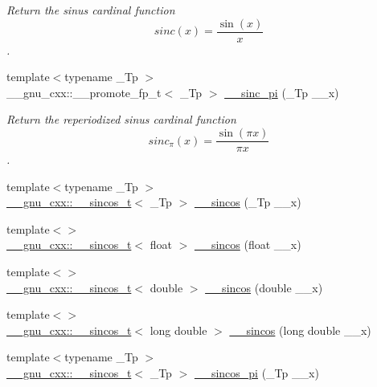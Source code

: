 \begin{DoxyCompactItemize}
\begin{DoxyCompactList}\small\item\em Return the sinus cardinal function \[ sinc(x) = \frac{\sin(x)}{x} \]. \end{DoxyCompactList}\item 
{\footnotesize template$<$typename \+\_\+\+Tp $>$ }\\\+\_\+\+\_\+gnu\+\_\+cxx\+::\+\_\+\+\_\+promote\+\_\+fp\+\_\+t$<$ \+\_\+\+Tp $>$ \hyperlink{namespacestd_1_1____detail_accfe65ec3790f60b0b429afbd4000bb1}{\+\_\+\+\_\+sinc\+\_\+pi} (\+\_\+\+Tp \+\_\+\+\_\+x)
\begin{DoxyCompactList}\small\item\em Return the reperiodized sinus cardinal function \[ sinc_\pi(x) = \frac{\sin(\pi x)}{\pi x} \]. \end{DoxyCompactList}\item 
{\footnotesize template$<$typename \+\_\+\+Tp $>$ }\\\hyperlink{struct____gnu__cxx_1_1____sincos__t}{\+\_\+\+\_\+gnu\+\_\+cxx\+::\+\_\+\+\_\+sincos\+\_\+t}$<$ \+\_\+\+Tp $>$ \hyperlink{namespacestd_1_1____detail_a59a9ff6922faa1a88da8b485ee9d37cb}{\+\_\+\+\_\+sincos} (\+\_\+\+Tp \+\_\+\+\_\+x)
\item 
{\footnotesize template$<$$>$ }\\\hyperlink{struct____gnu__cxx_1_1____sincos__t}{\+\_\+\+\_\+gnu\+\_\+cxx\+::\+\_\+\+\_\+sincos\+\_\+t}$<$ float $>$ \hyperlink{namespacestd_1_1____detail_a8cfd8b8345ebc359e31ac1631e29aeea}{\+\_\+\+\_\+sincos} (float \+\_\+\+\_\+x)
\item 
{\footnotesize template$<$$>$ }\\\hyperlink{struct____gnu__cxx_1_1____sincos__t}{\+\_\+\+\_\+gnu\+\_\+cxx\+::\+\_\+\+\_\+sincos\+\_\+t}$<$ double $>$ \hyperlink{namespacestd_1_1____detail_a76c185b3a0156ecf557afdbf552a8916}{\+\_\+\+\_\+sincos} (double \+\_\+\+\_\+x)
\item 
{\footnotesize template$<$$>$ }\\\hyperlink{struct____gnu__cxx_1_1____sincos__t}{\+\_\+\+\_\+gnu\+\_\+cxx\+::\+\_\+\+\_\+sincos\+\_\+t}$<$ long double $>$ \hyperlink{namespacestd_1_1____detail_aade98e6318f4459f37e1f79f4c871cf6}{\+\_\+\+\_\+sincos} (long double \+\_\+\+\_\+x)
\item 
{\footnotesize template$<$typename \+\_\+\+Tp $>$ }\\\hyperlink{struct____gnu__cxx_1_1____sincos__t}{\+\_\+\+\_\+gnu\+\_\+cxx\+::\+\_\+\+\_\+sincos\+\_\+t}$<$ \+\_\+\+Tp $>$ \hyperlink{namespacestd_1_1____detail_af17af8caca5ba47597cc314e93ba49cd}{\+\_\+\+\_\+sincos\+\_\+pi} (\+\_\+\+Tp \+\_\+\+\_\+x)

\end{DoxyCompactItemize}
